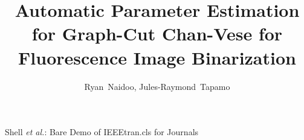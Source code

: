 \documentclass[10pt, journal, letterpaper, onecolumn, draftcls]{IEEEtran}
\begin{document}
%
\title{Automatic Parameter Estimation for Graph-Cut Chan-Vese for Fluorescence Image Binarization}
%
%
%

\author{Ryan~Naidoo, Jules-Raymond~Tapamo}

% 
%



%
{Shell \MakeLowercase{\textit{et al.}}: Bare Demo of IEEEtran.cls for Journals}
% 




\end{document}
